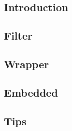 
\subsection{Introduction}


%

\subsection{Filter}


\subsection{Wrapper}


\subsection{Embedded}


\subsection{Tips}



